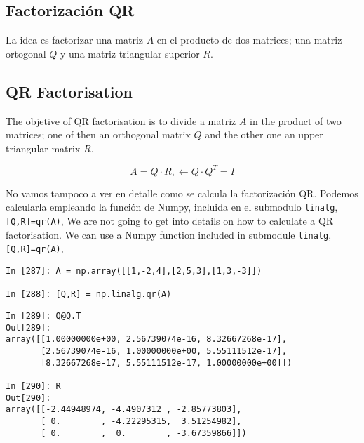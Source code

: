 \begin{paracol}{2}
\subsection{Factorización QR} \label{QR}
La idea es factorizar una matriz $A$ en el producto de dos matrices; una matriz ortogonal $Q$ y una matriz triangular superior $R$.
\switchcolumn
\subsection{QR Factorisation}
The objetive of QR factorisation is to divide a matriz $A$ in the product of two matrices; one of then an orthogonal matrix $Q$ and the other one an upper triangular matrix $R$.
\end{paracol}
\begin{equation*}
A=Q\cdot R, \leftarrow Q\cdot Q^T=I
\end{equation*}
\begin{paracol}{2}
No vamos tampoco a ver en detalle como se calcula la factorización QR. Podemos calcularla empleando la función de Numpy, incluida en el submodulo \texttt{linalg}, \texttt{[Q,R]=qr(A)},
\switchcolumn
We are not going to get into details on how to calculate a QR factorisation. We can use a Numpy function included in submodule \texttt{linalg}, \texttt{[Q,R]=qr(A)},
\end{paracol}
\begin{center}
    \begin{minipage}{0.7\textwidth}
    \begin{verbatim}
In [287]: A = np.array([[1,-2,4],[2,5,3],[1,3,-3]])

In [288]: [Q,R] = np.linalg.qr(A)
\end{verbatim}    
\end{minipage}
\end{center}
\begin{center}
\begin{minipage}{0.9\textwidth}
\begin{verbatim}
In [289]: Q@Q.T
Out[289]: 
array([[1.00000000e+00, 2.56739074e-16, 8.32667268e-17],
       [2.56739074e-16, 1.00000000e+00, 5.55111512e-17],
       [8.32667268e-17, 5.55111512e-17, 1.00000000e+00]])

In [290]: R
Out[290]: 
array([[-2.44948974, -4.4907312 , -2.85773803],
       [ 0.        , -4.22295315,  3.51254982],
       [ 0.        ,  0.        , -3.67359866]])
    \end{verbatim}    
    \end{minipage}
\end{center}

